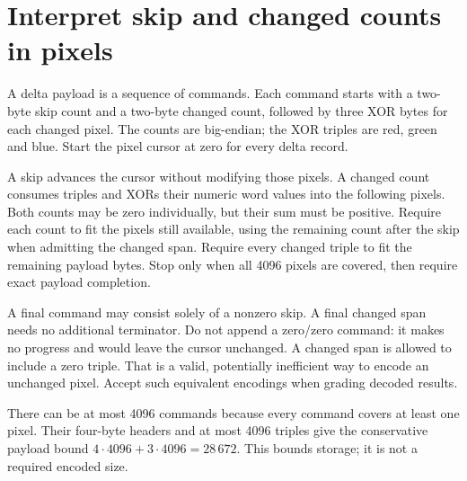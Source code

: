 \section{Interpret skip and changed counts in pixels}
A delta payload is a sequence of commands. Each command starts with a two-byte skip
count and a two-byte changed count, followed by three XOR bytes for each changed
pixel. The counts are big-endian; the XOR triples are red, green and blue. Start the
pixel cursor at zero for every delta record.

A skip advances the cursor without modifying those pixels. A changed count consumes
triples and XORs their numeric word values into the following pixels. Both counts
may be zero individually, but their sum must be positive. Require each count to fit
the pixels still available, using the remaining count after the skip when admitting
the changed span. Require every changed triple to fit the remaining payload bytes.
Stop only when all 4096 pixels are covered, then require exact payload completion.

A final command may consist solely of a nonzero skip. A final changed span needs no
additional terminator. Do not append a zero/zero command: it makes no progress and
would leave the cursor unchanged. A changed span is allowed to include a zero triple.
That is a valid, potentially inefficient way to encode an unchanged pixel. Accept
such equivalent encodings when grading decoded results.

There can be at most 4096 commands because every command covers at least one pixel.
Their four-byte headers and at most 4096 triples give the conservative payload bound
$4\cdot4096+3\cdot4096=28\,672$. This bounds storage; it is not a required encoded size.
